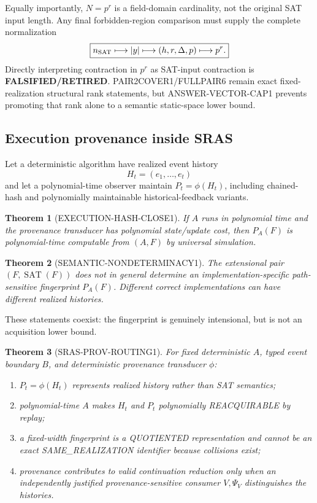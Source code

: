 \documentclass[11pt]{article}
\newcommand{\statusretired}{\textcolor{retired}{\textbf{FALSIFIED/RETIRED}}}
\theoremstyle{plain}
\newtheorem{theorem}{Theorem}[section]
\theoremstyle{definition}
\theoremstyle{remark}
\begin{document}
Equally importantly, \(N=p^r\) is a field-domain cardinality, not the
original SAT input length. Any final forbidden-region comparison must supply
the complete normalization
\[
\boxed{
n_{\rm SAT}\longmapsto |y|
\longmapsto (h,r,\Delta,p)
\longmapsto p^r .
}
\]
Directly interpreting contraction in \(p^r\) as SAT-input contraction is
\statusretired. PAIR2COVER1/FULLPAIR6 remain exact fixed-realization
structural rank statements, but ANSWER-VECTOR-CAP1 prevents promoting that
rank alone to a semantic static-space lower bound.

\subsection{Execution provenance inside SRAS}

Let a deterministic algorithm have realized event history
\[
H_t=(e_1,\ldots,e_t)
\]
and let a polynomial-time observer maintain \(P_t=\phi(H_t)\), including
chained-hash and polynomially maintainable historical-feedback variants.

\begin{theorem}[EXECUTION-HASH-CLOSE1]
If \(A\) runs in polynomial time and the provenance transducer has polynomial
state/update cost, then \(P_A(F)\) is polynomial-time computable from
\((A,F)\) by universal simulation.
\end{theorem}

\begin{theorem}[SEMANTIC-NONDETERMINACY1]
The extensional pair \((F,\operatorname{SAT}(F))\) does not in general
determine an implementation-specific path-sensitive fingerprint \(P_A(F)\).
Different correct implementations can have different realized histories.
\end{theorem}

These statements coexist: the fingerprint is genuinely intensional, but is
not an acquisition lower bound.

\begin{theorem}[SRAS-PROV-ROUTING1]
For fixed deterministic \(A\), typed event boundary \(B\), and deterministic
provenance transducer \(\phi\):
\begin{enumerate}[leftmargin=1.5em]
\item \(P_t=\phi(H_t)\) represents realized history rather than SAT semantics;
\item polynomial-time \(A\) makes \(H_t\) and \(P_t\) polynomially
REACQUIRABLE by replay;
\item a fixed-width fingerprint is a QUOTIENTED representation and cannot be
an exact SAME\_REALIZATION identifier because collisions exist;
\item provenance contributes to valid continuation reduction only when an
independently justified provenance-sensitive consumer \(V,\Psi_V\)
distinguishes the histories.
\end{enumerate}
\end{theorem}
\end{document}
